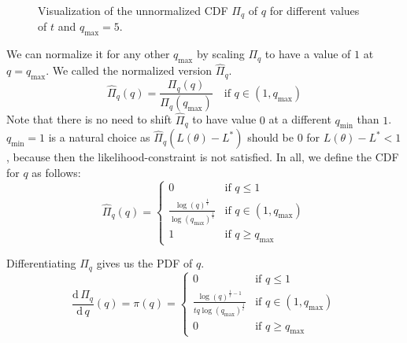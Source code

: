 \documentclass[12pt, a4paper]{report}
\begin{document}
\begin{figure}
    \centering
    \caption{Visualization of the unnormalized CDF $\Pi_q$ of $q$ for different values of $t$ and $q_{\textrm{max}}=5$.}
    \label{fig:unnormalized}
\end{figure}

We can normalize it for any other $q_{\textrm{max}}$ by scaling $\Pi_q$ to have a value of $1$ at $q=q_{\textrm{max}}$.
We called the normalized version $\hat{\Pi}_q$.
$$
\hat{\Pi}_q(q) = \frac{\Pi_q(q)}{\Pi_q(q_{\textrm{max}})} \quad \textrm{if } q \in (1, q_{\textrm{max}})
$$
Note that there is no need to shift $\hat{\Pi}_q$ to have value $0$ at a different $q_{\textrm{min}}$ than $1$.
$q_{\textrm{min}}=1$ is a natural choice as $\hat{\Pi}_q(L(\theta) - L^*)$ should be $0$ for $L(\theta) - L^* < 1$, because then the likelihood-constraint is not satisfied.
In all, we define the CDF for $q$ as follows:
$$
\hat{\Pi}_q(q) = 
\begin{cases}
    0 & \text{if } q \leq 1 \\
    \frac{\log(q)^\frac{1}{t}}{\log(q_{\textrm{max}})^\frac{1}{t}} & \text{if } q \in (1, q_{\textrm{max}})\\
    1 & \text{if } q \geq q_{\textrm{max}}
\end{cases}
$$

Differentiating $\hat{\Pi}_q$ gives us the PDF of $q$.
$$
    \frac{\textrm{d} \, \Pi_q}{\textrm{d} \, q} (q) = \pi(q) = 
    \begin{cases}
        0 & \text{if } q \leq 1 \\
        \frac{\log(q)^{\frac{1}{t}-1}}{tq\log(q_{\textrm{max}})^\frac{1}{t}} & \text{if } q \in (1, q_{\textrm{max}})\\
        0 & \text{if } q \geq q_{\textrm{max}}
    \end{cases}
$$
\end{document}
